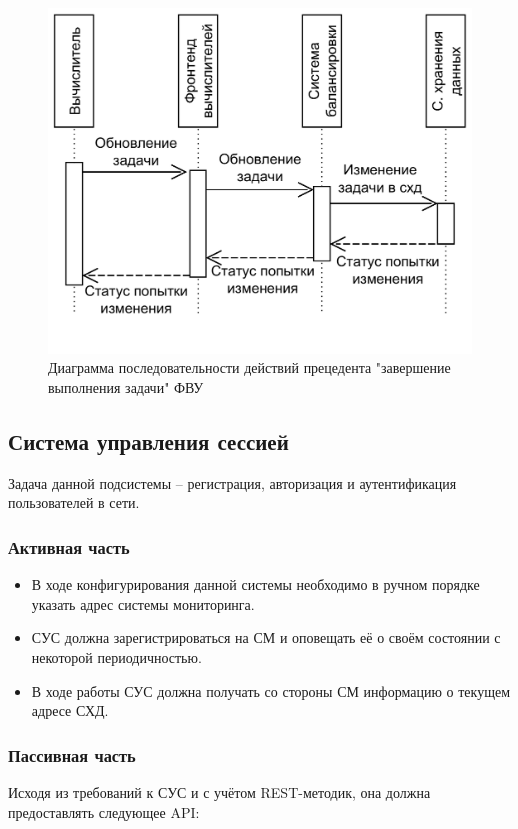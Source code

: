 \documentclass[a4paper,12pt]{report}
\numberwithin{equation}{section}
\begin{document}
  \begin{figure}
    \centering
    \includegraphics[width=.7\linewidth]{diagrams/frontnode/seq-submit}
    \caption{Диаграмма последовательности действий прецедента "завершение выполнения задачи" ФВУ}
    \label{fig:seq-sub}
  \end{figure}
  
  \subsection{Система управления сессией}
  Задача данной подсистемы -- регистрация, авторизация и аутентификация пользователей в сети.
  
  \subsubsection{Активная часть}
  \begin{itemize}
    \item В ходе конфигурирования данной системы необходимо в ручном порядке указать адрес системы мониторинга.
    \item СУС должна зарегистрироваться на СМ и оповещать её о своём состоянии с некоторой периодичностью.
    \item В ходе работы СУС должна получать со стороны СМ информацию о текущем адресе СХД.
  \end{itemize}
  
  \subsubsection{Пассивная часть}
  Исходя из требований к СУС и с учётом REST-методик, она должна предоставлять следующее API:
  
\end{document}
